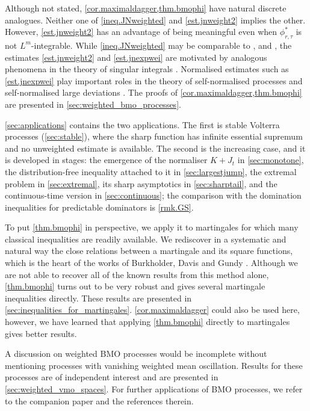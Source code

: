 \documentclass[12pt,oneside,reqno,fleqn]{amsart}
\numberwithin{equation}{section}
\theoremstyle{remark}
\newcommand{\1}{{\mathbf 1}}
\begin{document}
	Although not stated,
	\cref{cor.maximaldagger,thm.bmophi} have natural discrete analogues. 
	Neither one of \eqref{ineq.JNweighted} and \eqref{est.jnweight2} implies the other. However, \eqref{est.jnweight2} has an advantage of being meaningful even when $\phi^*_{r,\tau}$ is not $L^m$-integrable. While \eqref{ineq.JNweighted} may be comparable to \cite[Theorem 1]{MR2136865}, \cite[Theorem III.5.2]{MR0448538} and \cite[Lemma A.1.2]{MR2190038}, the estimates \eqref{est.jnweight2} and \eqref{est.jnexpwei} are motivated by analogous phenomena in the theory of singular integrals \cite{MR1913610,MR3124931}. Normalised estimates such as \eqref{est.jnexpwei} play important roles in the theory of self-normalised processes \cite{MR2488094} and self-normalised large deviations \cite{MR1428510,MR2016616}.
	The proofs of \cref{cor.maximaldagger,thm.bmophi} are presented in \cref{sec:weighted_bmo_processes}.

	\cref{sec:applications} contains the two applications. The first is stable Volterra processes (\cref{sec:stable}), where the sharp function has infinite essential supremum and no unweighted estimate is available. The second is the increasing case, and it is developed in stages: the emergence of the normaliser $K+J_t$ in \cref{sec:monotone}, the distribution-free inequality attached to it in \cref{sec:largestjump}, the extremal problem in \cref{sec:extremal}, its sharp asymptotics in \cref{sec:sharptail}, and the continuous-time version in \cref{sec:continuous}; the comparison with the domination inequalities for predictable dominators is \cref{rmk.GS}.

	To put \cref{thm.bmophi} in perspective, we apply it to martingales for which many classical inequalities are readily available. We rediscover in a systematic and natural way the close relations between a martingale and its square functions, which is the heart of the works of Burkholder, Davis and Gundy \cite{MR0400380,MR365692,davis1970intergrability}. Although we are not able to recover all of the known results from this method alone, \cref{thm.bmophi} turns out to be very robust and gives several martingale inequalities directly. These results are presented in \cref{sec:inequalities_for_martingales}. \cref{cor.maximaldagger} could also be used here, however, we have learned that applying \cref{thm.bmophi} directly to martingales gives better results.

	A discussion on weighted BMO processes would be incomplete without mentioning processes with vanishing weighted mean oscillation. Results for these processes are of independent interest and are presented in \cref{sec:weighted_vmo_spaces}.
	For further applications of BMO processes, we refer to the companion paper \cite{le2022stochastic} and the references therein.
\end{document}
